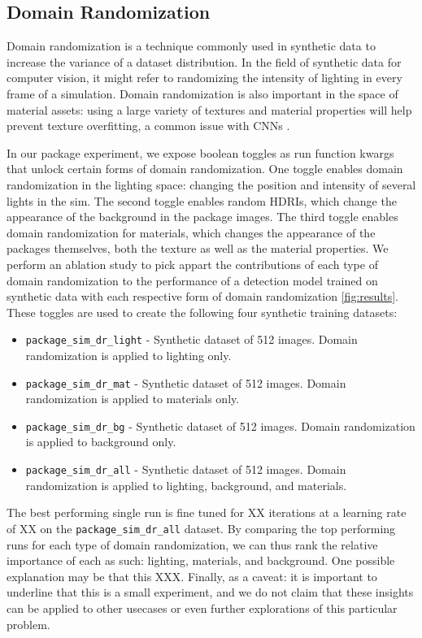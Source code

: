 \documentclass{article}
\begin{document}
\subsection{Domain Randomization}
\label{sec:domainrandomization}

Domain randomization is a technique commonly used in synthetic data to increase the variance of a dataset distribution. In the field of synthetic data for computer vision, it might refer to randomizing the intensity of lighting in every frame of a simulation. Domain randomization is also important in the space of material assets: using a large variety of textures and material properties will help prevent texture overfitting, a common issue with CNNs \cite{DBLP:journals/corr/abs-1811-12231}. 

In our package experiment, we expose boolean toggles as run function kwargs that unlock certain forms of domain randomization. One toggle enables domain randomization in the lighting space: changing the position and intensity of several lights in the sim. The second toggle enables random HDRIs, which change the appearance of the background in the package images. The third toggle enables domain randomization for materials, which changes the appearance of the packages themselves, both the texture as well as the material properties. We perform an ablation study to pick appart the contributions of each type of domain randomization to the performance of a detection model trained on synthetic data with each respective form of domain randomization \ref{fig:results}. These toggles are used to create the following four synthetic training datasets:

\begin{itemize}
	\item \lstinline{package_sim_dr_light} - Synthetic dataset of 512 images. Domain randomization is applied to lighting only.
	\item \lstinline{package_sim_dr_mat} - Synthetic dataset of 512 images. Domain randomization is applied to materials only.
	\item \lstinline{package_sim_dr_bg} - Synthetic dataset of 512 images. Domain randomization is applied to background only.
	\item \lstinline{package_sim_dr_all} - Synthetic dataset of 512 images. Domain randomization is applied to lighting, background, and materials.
\end{itemize}

The best performing single run is fine tuned for XX iterations at a learning rate of XX on the \lstinline{package_sim_dr_all} dataset. By comparing the top performing runs for each type of domain randomization, we can thus rank the relative importance of each as such: lighting, materials, and background. One possible explanation may be that this XXX. Finally, as a caveat: it is important to underline that this is a small experiment, and we do not claim that these insights can be applied to other usecases or even further explorations of this particular problem. 
\end{document}
